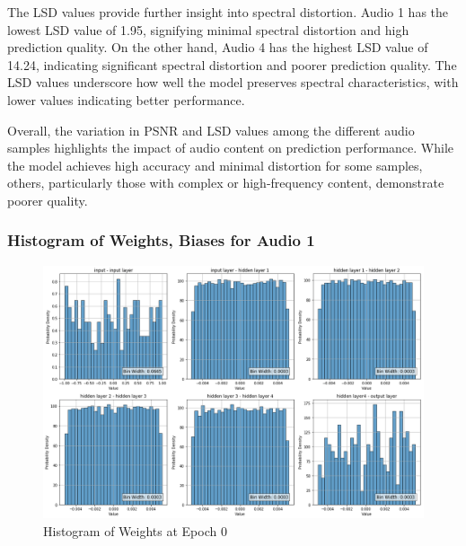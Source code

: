 \documentclass{ioereport}
\begin{document}
The LSD values provide further insight into spectral distortion. Audio 1 has the lowest LSD value of 1.95, signifying minimal spectral distortion and high prediction quality. On the other hand, Audio 4 has the highest LSD value of 14.24, indicating significant spectral distortion and poorer prediction quality. The LSD values underscore how well the model preserves spectral characteristics, with lower values indicating better performance.

Overall, the variation in PSNR and LSD values among the different audio samples highlights the impact of audio content on prediction performance. While the model achieves high accuracy and minimal distortion for some samples, others, particularly those with complex or high-frequency content, demonstrate poorer quality.


\subsubsection{Histogram of Weights, Biases for Audio 1}


    \begin{figure}[H]
        \centering
        \includegraphics[width=\linewidth]{assets/audio histogram/epoch0Weight.png}
        \caption{Histogram of Weights at Epoch 0}
        \label{fig:audio-weight-0}
    \end{figure}
\end{document}
